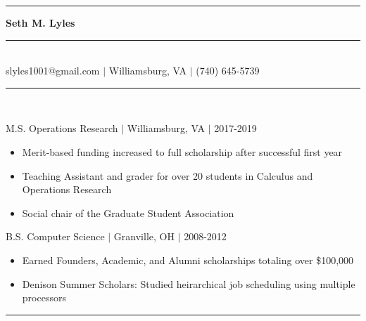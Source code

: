 \documentclass[11pt]{article}
\begin{document}
\begin{center}
\noindent\rule[5pt]{140pt}{.4pt}\LARGE\bf{ Seth M. Lyles }\rule[5pt]{140pt}{.4pt}\\ %
{\large slyles1001@gmail.com $|$ Williamsburg, VA $|$ (740) 645-5739}
\end{center}


\vspace{8pt}\hrule\vspace{10pt}
\\
\vspace{-8pt}

\hfill {M.S. Operations Research $|$ Williamsburg, VA $|$ 2017-2019}

\begin{itemize}
\item Merit-based funding increased to full scholarship after successful first year
\item Teaching Assistant and grader for over 20 students in Calculus and Operations Research
\item Social chair of the Graduate Student Association
\end{itemize}

\hfill { B.S. Computer Science $|$ Granville, OH $|$ 2008-2012}

\begin{itemize}
\item Earned Founders, Academic, and Alumni scholarships totaling over \$100,000
\item Denison Summer Scholars: Studied heirarchical job scheduling using multiple processors
\end{itemize}

\vspace{8pt}\hrule\vspace{10pt}
\\
\vspace{-8pt}
\end{document}
